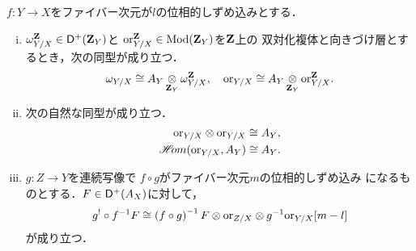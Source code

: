 \begin{PRP}
    \(f\colon Y\to X\)をファイバー次元が\(l\)の位相的しずめ込みとする．
    \begin{enumerate}[(i)]
        \item \(\omega_{Y/X}^{\mathbf{Z}}\in\mathop{\mathsf{D}^\mathrm{+}}\nolimits(\mathbf{Z}_Y)\)と
        \(\mathord{\mathrm{or}}_{Y/X}^{\mathbf{Z}}\in\mathop{\mathrm{Mod}}\nolimits(\mathbf{Z}_Y)\)を\(\mathbf{Z}\)上の
        双対化複体と向きづけ層とするとき，次の同型が成り立つ．\[
            \omega_{Y/X}\cong A_Y
            \mathop{\otimes}\limits_{\mathbf{Z}_Y}
            \omega_{Y/X}^{\mathbf{Z}}, 
            \quad
            \mathord{\mathrm{or}}_{Y/X}\cong A_Y
            \mathop{\otimes}\limits_{\mathbf{Z}_Y}
            \mathord{\mathrm{or}}_{Y/X}^{\mathbf{Z}}. 
        \]
        \item 次の自然な同型が成り立つ．
        \begin{align*}
                \mathord{\mathrm{or}}_{Y/X}\otimes \mathord{\mathrm{or}}_{Y/X}\cong A_Y,\\
                \mathop{\mathscr{H}\hspace{-2pt}om}\nolimits(\mathord{\mathrm{or}}_{Y/X},A_Y)\cong A_Y.
        \end{align*}
        \item \(g\colon Z\to Y\)を連続写像で
        \(f\circ g\)がファイバー次元\(m\)の位相的しずめ込み
        になるものとする．\(F\in\mathop{\mathsf{D}^\mathrm{+}}\nolimits(A_X)\)に対して，
        \[
            g^{!}\circ f^{-1}F
            \cong
            \left(f\circ g\right)^{-1}F
            \otimes \mathord{\mathrm{or}}_{Z/X}
            \otimes g^{-1}\mathord{\mathrm{or}}_{Y/X}[m-l]
        \]が成り立つ．
    \end{enumerate}
\end{PRP}
